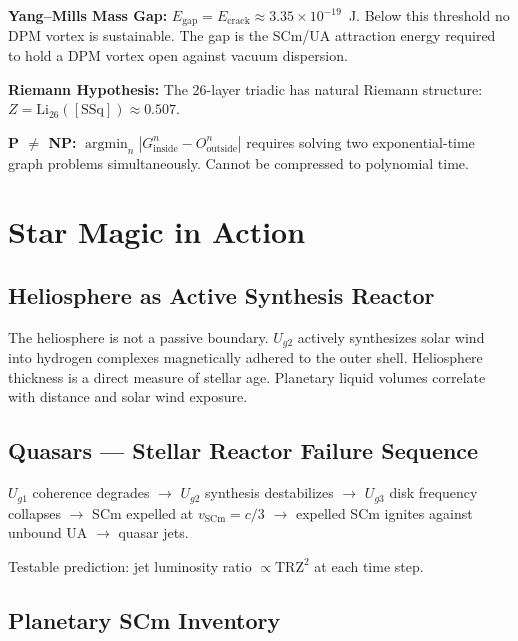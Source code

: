\documentclass[12pt,a4paper]{article}
\begin{document}
\noindent\textbf{Yang--Mills Mass Gap:}
$E_{\text{gap}} = E_{\text{crack}} \approx 3.35\times10^{-19}$~J.
Below this threshold no DPM vortex is sustainable.  The gap is the SCm/UA
attraction energy required to hold a DPM vortex open against vacuum dispersion.

\noindent\textbf{Riemann Hypothesis:}
The 26-layer triadic has natural Riemann structure:
$Z = \text{Li}_{26}([\text{SSq}]) \approx 0.507$.

\noindent\textbf{P $\neq$ NP:}
$\operatorname*{argmin}_n |G^n_{\text{inside}} - O^n_{\text{outside}}|$
requires solving two exponential-time graph problems simultaneously.
Cannot be compressed to polynomial time.

\section{Star Magic in Action}
\label{sec:star_magic}

\subsection{Heliosphere as Active Synthesis Reactor}

The heliosphere is not a passive boundary.  $U_{g2}$ actively synthesizes solar
wind into hydrogen complexes magnetically adhered to the outer shell.
Heliosphere thickness is a direct measure of stellar age.
Planetary liquid volumes correlate with distance and solar wind exposure.

\subsection{Quasars --- Stellar Reactor Failure Sequence}

$U_{g1}$ coherence degrades $\to$ $U_{g2}$ synthesis destabilizes
$\to$ $U_{g3}$ disk frequency collapses $\to$ SCm expelled at $v_{\text{SCm}} = c/3$
$\to$ expelled SCm ignites against unbound UA $\to$ quasar jets.

Testable prediction: jet luminosity ratio $\propto \text{TRZ}^2$ at each time step.

\subsection{Planetary SCm Inventory}
\end{document}
